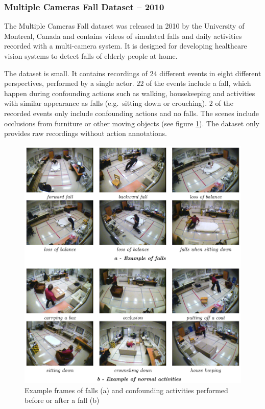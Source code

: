 

\subsubsection{Multiple Cameras Fall Dataset -- 2010}
The Multiple Cameras Fall dataset \cite{auvinet_multiple_2010} was released in 2010 by the University of Montreal, Canada and contains videos of simulated falls and daily activities recorded with a multi-camera system.
It is designed for developing healthcare vision systems to detect falls of elderly people at home.

The dataset is small. It contains recordings of $24$ different events in eight different perspectives, performed by a single actor.
$22$ of the events include a fall, which happen during confounding actions such as walking, housekeeping and activities with similar appearance as falls (e.g.\ sitting down or crouching).
$2$ of the recorded events only include confounding actions and no falls.
The scenes include occlusions from furniture or other moving objects (see figure \ref{fig:multiplecamerasfall_example}).
The dataset only provides raw recordings without action annotations.

\begin{figure}[H]
    \centering
    \includegraphics[width=\textwidth]{img_datasets/multiplecamerasfall_example}
    \caption{Example frames of falls (a) and confounding activities performed before or after a fall (b) \cite{auvinet_multiple_2010}}
    \label{fig:multiplecamerasfall_example}
\end{figure}


